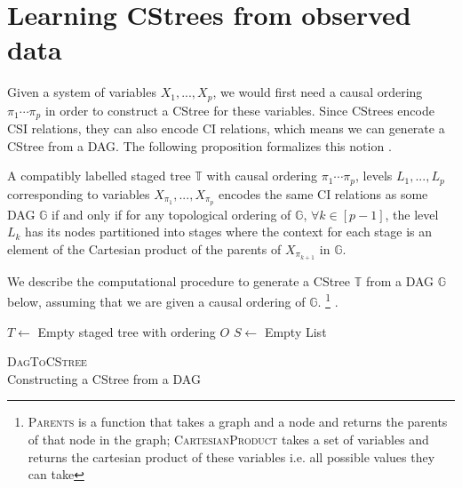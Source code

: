 \documentclass{tufte-book}
\begin{document}
\section{Learning CStrees from observed data}
\label{sec:org21056fd}
Given a system of variables \(X_1,...,X_p\), we would first need a causal ordering \(\pi_1 \cdots \pi_p\) in order to construct a CStree for these variables. Since CStrees encode CSI relations, they can also encode CI relations, which means we can generate a CStree from a DAG. The following proposition formalizes this notion \cite{duarte-2020-algeb}.

\begin{proposition}\label{prop:dagandcstree}
A compatibly labelled staged tree $\mathbb{T}$ with causal ordering $\pi_1 \cdots\pi_p$, levels $L_1,...,L_p$ corresponding to variables $X_{\pi_1},...,X_{\pi_p}$ encodes the same CI relations as some DAG $\mathbb{G}$ if and only if for any topological ordering of $\mathbb{G}$, $\forall k \in [p-1]$, the level $L_k$ has its nodes partitioned into stages where the context for each stage is an element of the Cartesian product of the parents of $X_{\pi_{k+1}}$ in $\mathbb{G}$.
\end{proposition}

We describe the computational procedure to generate a CStree \(\mathbb{T}\) from a DAG \(\mathbb{G}\) below, assuming that we are given a causal ordering of \(\mathbb{G}\).  \footnote{\textsc{Parents} is a function that takes a graph and a node and returns the parents of that node in the graph; \textsc{CartesianProduct} takes a set of variables and returns the cartesian product of these variables i.e. all possible values they can take} .



\begin{algorithm}[H]
\label{alg:dagtocstree}
      \SetAlgoLined
      $T \gets$ Empty staged tree with ordering $O$\;
      $S \gets$ Empty List\;
       \caption{\textsc{DagToCStree}\\Constructing a CStree from a DAG}
      \end{algorithm}
\end{document}
